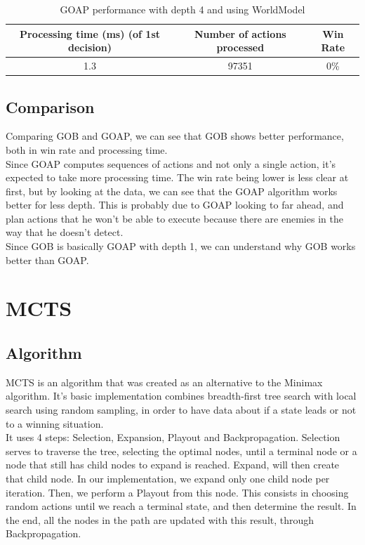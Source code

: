 \documentclass{article}
\begin{document}
  \begin{table}[h!]
    \centering
    \caption{GOAP performance with depth 4 and using WorldModel}
    \label{tab:tableGOAP6}
    \begin{tabular}{c|c|c}
      \textbf{Processing time (ms) (of 1st decision)} & \textbf{Number of actions processed} & \textbf{Win Rate}\\
      \hline
      1.3 & 97351 & 0\%
    \end{tabular}
  \end{table}
  \subsection{Comparison}
  Comparing GOB and GOAP, we can see that GOB shows better performance, both in win rate and processing time. \\
  Since GOAP computes sequences of actions and not only a single action, it's expected to take more processing time. The win rate being lower is less clear at first, but
  by looking at the data, we can see that the GOAP algorithm works better for less depth. This is probably due to GOAP looking to far ahead, and plan actions 
  that he won't be able to execute because there are enemies in the way that he doesn't detect. \\
  Since GOB is basically GOAP with depth 1, we can understand why GOB works better than GOAP.
  
  \section{MCTS}
  \subsection{Algorithm}
  MCTS is an algorithm that was created as an alternative to the Minimax algorithm. It's basic implementation combines breadth-first tree search with local search using
  random sampling, in order to have data about if a state leads or not to a winning situation.\\
  It uses 4 steps: Selection, Expansion, Playout and Backpropagation. Selection serves to traverse the tree, selecting the optimal nodes, until a terminal node or a node that 
  still has child nodes to expand is reached. Expand, will then create that child node. In our implementation, we expand only one child node per iteration. Then, we perform 
  a Playout from this node. This consists in choosing random actions until we reach a terminal state, and then determine the result.
  In the end, all the nodes in the path are updated with this result, through Backpropagation.
  
\end{document}
